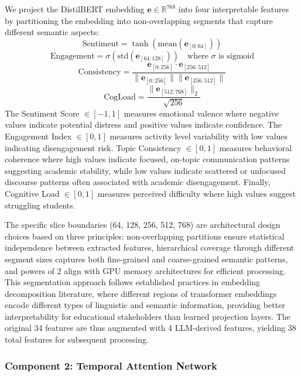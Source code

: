 \documentclass[journal]{IEEEtran}
\begin{document}
We project the DistilBERT embedding $\mathbf{e} \in \mathbb{R}^{768}$ into four interpretable features by partitioning the embedding into non-overlapping segments that capture different semantic aspects:
\begin{equation}
\text{Sentiment} = \tanh(\text{mean}(\mathbf{e}_{[0:64]}))
\end{equation}
\begin{equation}
\text{Engagement} = \sigma(\text{std}(\mathbf{e}_{[64:128]})) \quad \text{where } \sigma \text{ is sigmoid}
\end{equation}
\begin{equation}
\text{Consistency} = \frac{\mathbf{e}_{[0:256]} \cdot \mathbf{e}_{[256:512]}}{\|\mathbf{e}_{[0:256]}\| \|\mathbf{e}_{[256:512]}\|}
\end{equation}
\begin{equation}
\text{CogLoad} = \frac{\|\mathbf{e}_{[512:768]}\|_2}{\sqrt{256}}
\end{equation}
The Sentiment Score $\in [-1, 1]$ measures emotional valence where negative values indicate potential distress and positive values indicate confidence. The Engagement Index $\in [0, 1]$ measures activity level variability with low values indicating disengagement risk. Topic Consistency $\in [0, 1]$ measures behavioral coherence where high values indicate focused, on-topic communication patterns suggesting academic stability, while low values indicate scattered or unfocused discourse patterns often associated with academic disengagement. Finally, Cognitive Load $\in [0, 1]$ measures perceived difficulty where high values suggest struggling students.

The specific slice boundaries (64, 128, 256, 512, 768) are architectural design choices based on three principles: non-overlapping partitions ensure statistical independence between extracted features, hierarchical coverage through different segment sizes captures both fine-grained and coarse-grained semantic patterns, and powers of 2 align with GPU memory architectures for efficient processing. This segmentation approach follows established practices in embedding decomposition literature, where different regions of transformer embeddings encode different types of linguistic and semantic information, providing better interpretability for educational stakeholders than learned projection layers. The original 34 features are thus augmented with 4 LLM-derived features, yielding 38 total features for subsequent processing.

\subsubsection{Component 2: Temporal Attention Network}
\end{document}
